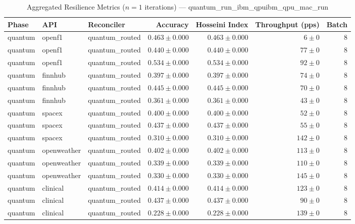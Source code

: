 
\begin{table}[htbp]
\caption{Aggregated Resilience Metrics ($n=1$ iterations) --- quantum_run_ibm_qpuibm_qpu_mac_run}
\begin{tabular}{l l l r r r r}
\hline
Phase & API & Reconciler & Accuracy & Hosseini Index & Throughput (pps) & Batch \\
\hline
quantum & openf1 & quantum\_routed & $0.463\pm0.000$ & $0.463\pm0.000$ & $6\pm0$ & 8 \\
quantum & openf1 & quantum\_routed & $0.440\pm0.000$ & $0.440\pm0.000$ & $77\pm0$ & 8 \\
quantum & openf1 & quantum\_routed & $0.534\pm0.000$ & $0.534\pm0.000$ & $92\pm0$ & 8 \\
quantum & finnhub & quantum\_routed & $0.397\pm0.000$ & $0.397\pm0.000$ & $74\pm0$ & 8 \\
quantum & finnhub & quantum\_routed & $0.445\pm0.000$ & $0.445\pm0.000$ & $70\pm0$ & 8 \\
quantum & finnhub & quantum\_routed & $0.361\pm0.000$ & $0.361\pm0.000$ & $43\pm0$ & 8 \\
quantum & spacex & quantum\_routed & $0.400\pm0.000$ & $0.400\pm0.000$ & $52\pm0$ & 8 \\
quantum & spacex & quantum\_routed & $0.437\pm0.000$ & $0.437\pm0.000$ & $55\pm0$ & 8 \\
quantum & spacex & quantum\_routed & $0.310\pm0.000$ & $0.310\pm0.000$ & $142\pm0$ & 8 \\
quantum & openweather & quantum\_routed & $0.402\pm0.000$ & $0.402\pm0.000$ & $113\pm0$ & 8 \\
quantum & openweather & quantum\_routed & $0.339\pm0.000$ & $0.339\pm0.000$ & $110\pm0$ & 8 \\
quantum & openweather & quantum\_routed & $0.330\pm0.000$ & $0.330\pm0.000$ & $145\pm0$ & 8 \\
quantum & clinical & quantum\_routed & $0.414\pm0.000$ & $0.414\pm0.000$ & $123\pm0$ & 8 \\
quantum & clinical & quantum\_routed & $0.437\pm0.000$ & $0.437\pm0.000$ & $90\pm0$ & 8 \\
quantum & clinical & quantum\_routed & $0.228\pm0.000$ & $0.228\pm0.000$ & $139\pm0$ & 8 \\

\end{tabular}
\end{table}
